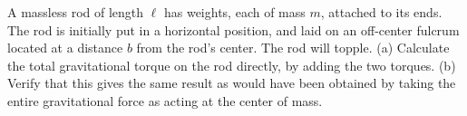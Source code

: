 A massless rod of length $\ell$ has weights, each of mass $m$, attached to its ends. The rod is initially put in
a horizontal position, and laid on an off-center fulcrum located at a distance $b$ from the rod's center. The rod will
topple. (a) Calculate the total gravitational torque on the rod directly, by adding the two torques.
(b) Verify that this gives the same result as would have been obtained by taking the entire gravitational
force as acting at the center of mass.
